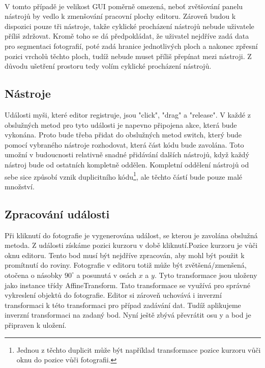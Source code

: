 \documentclass[11pt,twoside,a4paper]{book}
\begin{document}
\paragraph{}
V tomto případě je velikost GUI poměrně omezená, neboť zvětšování panelu nástrojů by vedlo k zmenšování pracovní plochy editoru. Zároveň budou k dispozici pouze tři nástroje, takže cyklické procházení nástrojů nebude uživatele příliš zdržovat. Kromě toho se dá předpokládat, že uživatel nejdříve zadá data pro segmentaci fotografií, poté zadá hranice jednotlivých ploch a nakonec zpřesní pozici vrcholů těchto ploch, tudíž nebude muset příliš přepínat mezi nástroji. Z důvodu ušetření prostoru tedy volím cyklické procházení nástrojů.

\subsection{Nástroje}
Události myši, které editor registruje, jsou "click", "drag" a "release". V každé z obslužných metod pro tyto události je napevno připojena akce, která bude vykonána. Proto bude třeba přidat do obslužných metod switch, který bude pomocí vybraného nástroje rozhodovat, která část kódu bude zavolána. Toto umožní v budoucnosti relativně snadné přidávání dalších nástrojů, když každý nástroj bude od ostatních kompletně oddělen. Kompletní oddělení nástrojů od sebe sice způsobí vznik duplicitního kódu\footnote{Jednou z těchto duplicit může být například transformace pozice kurzoru vůči oknu do pozice vůči fotografii.}, ale těchto částí bude pouze malé množství.

\subsection{Zpracování události}
Při kliknutí do fotografie je vygenerována událost, se kterou je zavolána obslužná metoda. Z události získáme pozici kurzoru v době kliknutí.Pozice kurzoru je vůči oknu editoru. Tento bod musí být nejdříve zpracován, aby mohl být použit k promítnutí do roviny. Fotografie v editoru totiž může být zvětšená/zmenšená, otočena o násobky $90^{\circ}$ a posunutá v osách $x$ a $y$. Tyto transformace jsou uloženy jako instance třídy AffineTransform. Tato transformace se využívá pro správné vykreslení objektů do fotografie. Editor si zároveň uchovává i inverzní transformaci k této transformaci pro případ zadávání dat. Tudíž aplikujeme inverzní transformaci na zadaný bod. Nyní ještě zbývá převrátit osu y a bod je připraven k uložení.
\end{document}
